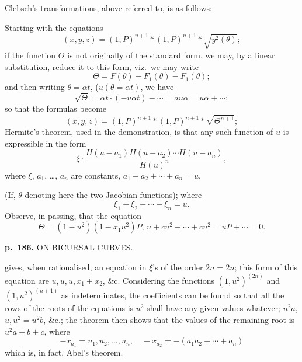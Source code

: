 \documentclass[11pt,a4paper]{book}
\begin{document}
Clebsch's transformations, above referred to, is as follows:

Starting with the equations
\[
(x, y, z) = (1, P)^{n+1} \ast (1, P)^{n+1} \ast \sqrt{y^2(\theta)};
\]
if the function $\Theta$ is not originally of the standard form, we may, by a linear substitution, reduce it to this form, viz.\ we may write
\[
\Theta = F(\theta) - F_1(\theta) - F_1(\theta);
\]
and then writing $\theta = \alpha t$, ($u(\theta = \alpha t)$, we have
\[
\sqrt{\Theta} = \alpha t \cdot (-u \alpha t) - \cdots = a u \alpha = u \alpha + \cdots;
\]
so that the formulas become
\[
(x, y, z) = (1, P)^{n+1} \ast (1, P)^{n+1} \ast \sqrt{\Theta^{n+1}};
\]
Hermite's theorem, used in the demonstration, is that any such function of $u$ is expressible in the form
\[
\xi \cdot \frac{H(u - a_1) H(u - a_2) \cdots H(u - a_n)}{H(u)^n},
\]
where $\xi$, $a_1$, \ldots, $a_n$ are constants, $a_1 + a_2 + \cdots + a_n = u$.

(If, $\theta$ denoting here the two Jacobian functions); where
\[
\xi_1 + \xi_2 + \cdots + \xi_n = u.
\]
Observe, in passing, that the equation
\[
\Theta = (1 - u^2)(1 - x_1 u^2)P, \, u + c u^2 + \cdots + c u^2 = u P + \cdots = 0.
\]

\clearpage

\noindent
\textbf{p.~186.}  ON BICURSAL CURVES.

gives, when rationalised, an equation in $\xi$'s of the order $2n = 2n$; this form of this equation are $u, u, u, x_1 + x_2$, \&c.  Considering the functions $(1, u^2)^{(2n)}$ and $(1, u^2)^{(n+1)}$ as indeterminates, the coefficients can be found so that all the rows of the roots of the equations is $u^2$ shall have any given values whatever; $u^2 a$, $u, u^2 = u^2 b$, \&c.; the theorem then shows that the values of the remaining root is $u^2 a + b + c$, where
\[
-x_{a_1} = u_1, u_2, \ldots, u_n, \quad -x_{a_2} = -(a_1 a_2 + \cdots + a_n)
\]
which is, in fact, Abel's theorem.
\end{document}
